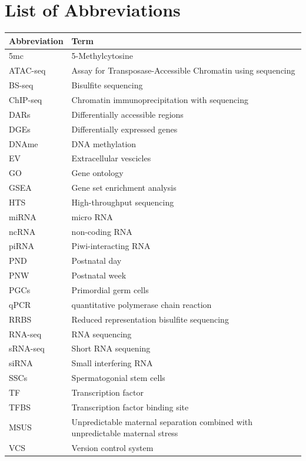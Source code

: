 \documentclass[12pt,twoside]{reedthesis}
\begin{document}
\begin{acknowledgements}
  \end{acknowledgements}

  \hypersetup{linkcolor=black}
  \setcounter{secnumdepth}{4}
  \setcounter{tocdepth}{4}
  \tableofcontents

  \listoftables

  \listoffigures



\mainmatter %
\pagestyle{fancyplain} %

\hypertarget{list-of-abbreviations}{%
\chapter*{List of Abbreviations}\label{list-of-abbreviations}}
\begin{tabular}{ll}
\toprule
Abbreviation & Term\\
\midrule
5mc & 5-Methylcytosine\\
ATAC-seq & Assay for Transposase-Accessible Chromatin using sequencing\\
BS-seq & Bisulfite sequencing\\
ChIP-seq & Chromatin immunoprecipitation with sequencing\\
DARs & Differentially accessible regions\\
\addlinespace
DGEs & Differentially expressed genes\\
DNAme & DNA methylation\\
EV & Extracellular vescicles\\
GO & Gene ontology\\
GSEA & Gene set enrichment analysis\\
\addlinespace
HTS & High-throughput sequencing\\
miRNA & micro RNA\\
ncRNA & non-coding RNA\\
piRNA & Piwi-interacting RNA\\
PND & Postnatal day\\
\addlinespace
PNW & Postnatal week\\
PGCs & Primordial germ cells\\
qPCR & quantitative polymerase chain reaction\\
RRBS & Reduced representation bisulfite sequencing\\
RNA-seq & RNA sequencing\\
\addlinespace
sRNA-seq & Short RNA sequening\\
siRNA & Small interfering RNA\\
SSCs & Spermatogonial stem cells\\
TF & Transcription factor\\
TFBS & Transcription factor binding site\\
\addlinespace
MSUS & Unpredictable maternal separation combined with unpredictable maternal stress\\
VCS & Version control system\\
\bottomrule
\end{tabular}
\end{document}

